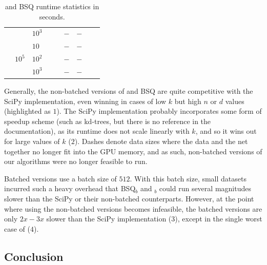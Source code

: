 \begin{table}[t]
\begin{tabular}{|l|l|l|r r r r r|l}
					\cline{3-3}
					& 							& $10^3$			&\hlthree{$70.19$}	&\hlthree{$82.23$}	& $-$			& $-$			&\hlthree{$29.26$}	&\hlthree{}		\\
					\cline{2-8}
					& \multirow{3}{*}{$10^5$}	& $10$				&\hlthree{$42.39$}	&\hlthree{$44.93$}	& $-$			& $-$			&\hlthree{$16.87$}	&\hlthree{}		\\
					\cline{3-3}
					& 							& $10^2$			&\hlthree{$83.01$}	&\hlthree{$99.08$}	& $-$			& $-$			&\hlthree{$40.05$}	&\hlthree{}		\\
					\cline{3-3}
					& 							& $10^3$			&\hlthree{$546.09$}	&\hlthree{$669.21$}	& $-$			& $-$			&\hlthree{$296.92$}	&\hlthree{\multirow{-4}{*}{$(3)$}}	\\
					\cline{1-8}
				\end{tabular}
				\caption[Neural-net-based \kmeans{} and BSQ statistics]{\kmeans{} and BSQ runtime statistics in seconds.}
				\label{tab:times}
			\end{table}
			
			Generally, the non-batched versions of \kmeans{} and \ac{BSQ} are quite competitive with the SciPy implementation, even winning in cases of low $k$ but high $n$ or $d$ values (highlighted as $1$).
			The SciPy implementation probably incorporates some form of speedup scheme (such as kd-trees, but there is no reference in the documentation), as its runtime does not scale linearly with $k$, and so it wins out for large values of $k$ ($2$).
			Dashes denote data sizes where the data and the net together no longer fit into the \ac{GPU} memory, and as such, non-batched versions of our algorithms were no longer feasible to run.
			
			Batched versions use a batch size of $512$.
			With this batch size, small datasets incurred such a heavy overhead that \ac{BSQ}$_b$ and \kmeans{}$_b$ could run several magnitudes slower than the SciPy or their non-batched counterparts.
			However, at the point where using the non-batched versions becomes infeasible, the batched versions are only $2x-3x$ slower than the SciPy implementation ($3$), except in the single worst case of ($4$).
			
		\subsection{Conclusion}
		
